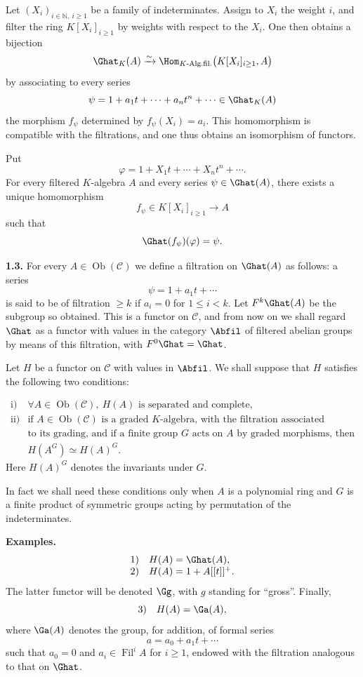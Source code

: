 \documentclass[11pt]{article}
\newcommand{\Fil}{\operatorname{Fil}}
\begin{document}
Let \((X_i)_{i\in\mathbb N,\ i\geq 1}\) be a family of indeterminates. Assign to \(X_i\) the weight \(i\), and filter the ring \(K[X_i]_{i\geq 1}\) by weights with respect to the \(X_i\). One then obtains a bijection
\[
  \Ghat_K(A)\xrightarrow{\sim}
  \Hom_{K\text{-Alg.fil.}}\bigl(K[X_i]_{i\geq 1},A\bigr)
\]
by associating to every series
\[
  \psi=1+a_1t+\cdots+a_nt^n+\cdots\in\Ghat_K(A)
\]
the morphism \(f_\psi\) determined by \(f_\psi(X_i)=a_i\). This homomorphism is compatible with the filtrations, and one thus obtains an isomorphism of functors.

Put
\[
  \varphi=1+X_1t+\cdots+X_nt^n+\cdots .
\]
For every filtered \(K\)-algebra \(A\) and every series \(\psi\in\Ghat(A)\), there exists a unique homomorphism
\[
  f_\psi\in K[X_i]_{i\geq 1}\longrightarrow A
\]
such that
\[
  \Ghat(f_\psi)(\varphi)=\psi .
\]

\textbf{1.3.} For every \(A\in\operatorname{Ob}(\mathcal C)\) we define a filtration on \(\Ghat(A)\) as follows: a series
\[
  \psi=1+a_1t+\cdots
\]
is said to be of filtration \(\geq k\) if \(a_i=0\) for \(1\leq i<k\). Let \(F^k\Ghat(A)\) be the subgroup so obtained. This is a functor on \(\mathcal C\), and from now on we shall regard \(\Ghat\) as a functor with values in the category \(\Abfil\) of filtered abelian groups by means of this filtration, with \(F^0\Ghat=\Ghat\).

Let \(H\) be a functor on \(\mathcal C\) with values in \(\Abfil\). We shall suppose that \(H\) satisfies the following two conditions:

\[
\begin{array}{ll}
\text{i)} & \forall A\in\operatorname{Ob}(\mathcal C),\ H(A)\text{ is separated and complete},\\[0.3em]
\text{ii)} & \text{if }A\in\operatorname{Ob}(\mathcal C)\text{ is a graded }K\text{-algebra, with the filtration associated}\\
&\text{to its grading, and if a finite group }G\text{ acts on }A\text{ by graded morphisms, then}\\
& H(A^G)\simeq H(A)^G .
\end{array}
\]
Here \(H(A)^G\) denotes the invariants under \(G\).

In fact we shall need these conditions only when \(A\) is a polynomial ring and \(G\) is a finite product of symmetric groups acting by permutation of the indeterminates.

\textbf{Examples.}
\[
\begin{array}{ll}
1)& H(A)=\Ghat(A),\\
2)& H(A)=1+A[[t]]^+.
\end{array}
\]
The latter functor will be denoted \(\Gg\), with \(g\) standing for ``gross''. Finally,
\[
3)\quad H(A)=\Ga(A),
\]
where \(\Ga(A)\) denotes the group, for addition, of formal series
\[
  a=a_0+a_1t+\cdots
\]
such that \(a_0=0\) and \(a_i\in\Fil^i A\) for \(i\geq 1\), endowed with the filtration analogous to that on \(\Ghat\).
\end{document}
